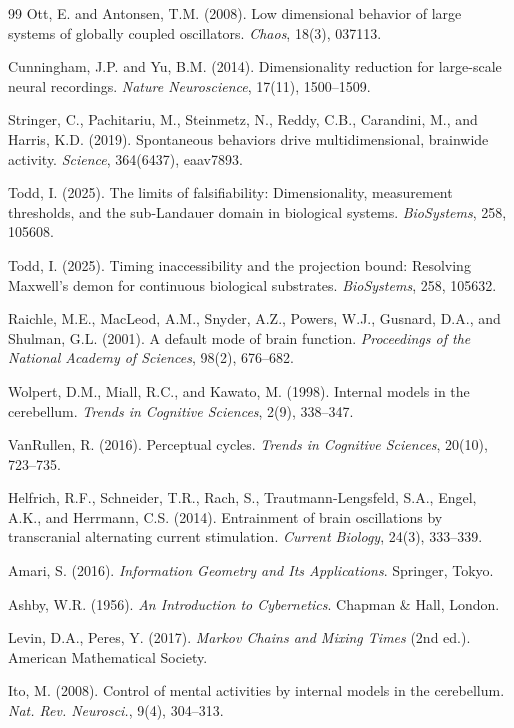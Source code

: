 \documentclass[12pt]{article}
\begin{document}
\begin{thebibliography}{99}
Ott, E. and Antonsen, T.M. (2008). Low dimensional behavior of large systems of globally coupled oscillators. \textit{Chaos}, 18(3), 037113.

Cunningham, J.P. and Yu, B.M. (2014). Dimensionality reduction for large-scale neural recordings. \textit{Nature Neuroscience}, 17(11), 1500--1509.

Stringer, C., Pachitariu, M., Steinmetz, N., Reddy, C.B., Carandini, M., and Harris, K.D. (2019). Spontaneous behaviors drive multidimensional, brainwide activity. \textit{Science}, 364(6437), eaav7893.

Todd, I. (2025). The limits of falsifiability: Dimensionality, measurement thresholds, and the sub-Landauer domain in biological systems. \textit{BioSystems}, 258, 105608.

Todd, I. (2025). Timing inaccessibility and the projection bound: Resolving Maxwell's demon for continuous biological substrates. \textit{BioSystems}, 258, 105632.

Raichle, M.E., MacLeod, A.M., Snyder, A.Z., Powers, W.J., Gusnard, D.A., and Shulman, G.L. (2001). A default mode of brain function. \textit{Proceedings of the National Academy of Sciences}, 98(2), 676--682.

Wolpert, D.M., Miall, R.C., and Kawato, M. (1998). Internal models in the cerebellum. \textit{Trends in Cognitive Sciences}, 2(9), 338--347.

VanRullen, R. (2016). Perceptual cycles. \textit{Trends in Cognitive Sciences}, 20(10), 723--735.

Helfrich, R.F., Schneider, T.R., Rach, S., Trautmann-Lengsfeld, S.A., Engel, A.K., and Herrmann, C.S. (2014). Entrainment of brain oscillations by transcranial alternating current stimulation. \textit{Current Biology}, 24(3), 333--339.

Amari, S. (2016). \textit{Information Geometry and Its Applications}. Springer, Tokyo.

Ashby, W.R. (1956). \textit{An Introduction to Cybernetics}. Chapman \& Hall, London.

Levin, D.A., Peres, Y. (2017). \textit{Markov Chains and Mixing Times} (2nd ed.). American Mathematical Society.

Ito, M. (2008). Control of mental activities by internal models in the cerebellum. \textit{Nat. Rev. Neurosci.}, 9(4), 304--313.


\end{thebibliography}
\end{document}

